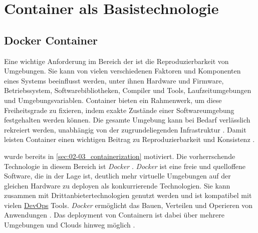 \section{Container als Basistechnologie}
\label{sec:05-01_containers-as-base-technology}

\subsection{Docker Container}
\label{subsec:05-01-01_docker-container}

Eine wichtige Anforderung im Bereich der  ist die Reproduzierbarkeit von Umgebungen. Sie kann von vielen verschiedenen Faktoren und Komponenten eines Systems beeinflusst werden, unter ihnen Hardware und Firmware, Betriebssystem, Softwarebibliotheken, Compiler und Tools, Laufzeitumgebungen und Umgebungsvariablen. Container bieten ein Rahmenwerk, um diese Freiheitsgrade zu fixieren, indem exakte Zustände einer Softwareumgebung festgehalten werden können. Die gesamte Umgebung kann bei Bedarf verlässlich rekreiert werden, unabhängig von der zugrundeliegenden Infrastruktur \cite{013:Role-of-Containers-in-Reproducibility}. Damit leisten Container einen wichtigen Beitrag zu Reproduzierbarkeit und Konsistenz \cite{013:Role-of-Containers-in-Reproducibility,014:Managing-Container-based-Software-Development-Environments,023:Setting-up-CI-CD-Pipeline-in-the-Cloud-for-Web-Application,024:Investiugating-Impact-of-Containerization-on-Deployment-Process-in-DevOps}.

 wurde bereits in \autoref{sec:02-03_containerization} motiviert. Die vorherrschende Technologie in diesem Bereich ist \textit{Docker} \cite{015:Containers-in-Software-Development,021:Docker-Security-Threat-Model-and-Best-Practices}. \textit{Docker} ist eine freie und quelloffene Software, die in der Lage ist, deutlich mehr virtuelle Umgebungen auf der gleichen Hardware zu deployen als konkurrierende Technologien. Sie kann zusammen mit Drittanbietertechnologien genutzt werden und ist kompatibel mit vielen \hyperref[sec:03-01_devops]{DevOps} Tools. \textit{Docker} ermöglicht das Bauen, Verteilen und Operieren von Anwendungen \cite{021:Docker-Security-Threat-Model-and-Best-Practices}. Das \Gls{deployment} von Containern ist dabei über mehrere Umgebungen und Clouds hinweg möglich \cite{023:Setting-up-CI-CD-Pipeline-in-the-Cloud-for-Web-Application,024:Investiugating-Impact-of-Containerization-on-Deployment-Process-in-DevOps}.

